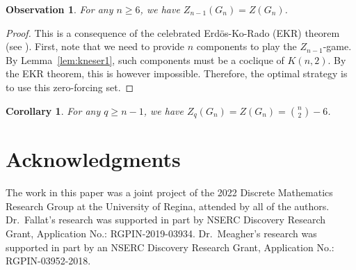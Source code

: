 \documentclass[3p,times,12pt]{article}
\newtheorem{cor}[theorem]{Corollary}
\newtheorem{obs}[theorem]{Observation}
\begin{document}
	
	\begin{obs}
		For any $n\geq 6$, we have $Z_{n-1}(G_n) = Z(G_n)$.
	\end{obs}
	\begin{proof}
		This is a consequence of the celebrated Erd\"os-Ko-Rado (EKR) theorem (see \cite{GM}). First, note that we need to provide $n$ components to play the $Z_{n-1}$-game. By Lemma~\ref{lem:kneser1}, such components must be a coclique of $K(n,2)$. By the EKR theorem, this is however impossible. Therefore, the optimal strategy is to use this zero-forcing set.
	\end{proof}
	\begin{cor}
		For any $q\geq n-1$, we have $Z_q(G_n) = Z(G_n) = \binom{n}{2}-6$.
	\end{cor}





\section*{Acknowledgments}
The work in this paper was a joint project of the
2022 Discrete Mathematics Research Group at the University of Regina, attended by
all of the authors. 
Dr.~Fallat's research was supported in part by NSERC Discovery Research Grant, Application No.: RGPIN-2019-03934. Dr.~Meagher's research was supported in part by an NSERC Discovery Research Grant, Application No.: RGPIN-03952-2018. 


\vspace{5mm}
\end{document}
